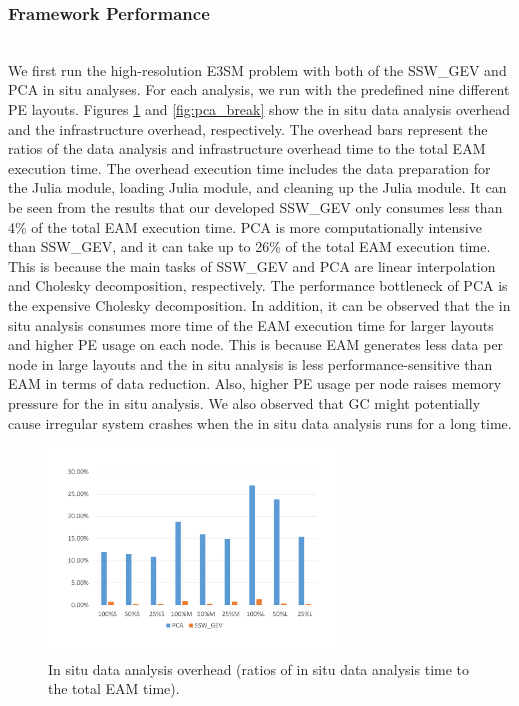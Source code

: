 \documentclass{juliacon}
\begin{document}
\subsubsection{Framework Performance}\hspace*{\fill} \\

We first run the high-resolution E3SM problem with both of the SSW\_GEV and PCA in situ analyses. For each analysis, we run with the predefined nine different PE layouts. Figures \ref{fig:ssw_break} and \ref{fig:pca_break} show the in situ data analysis overhead and the infrastructure overhead, respectively. The overhead bars represent the ratios of the data analysis and infrastructure overhead time to the total EAM execution time. The overhead execution time includes the data preparation for the Julia module, loading Julia module, and cleaning up the Julia module. It can be seen from the results that our developed SSW\_GEV only consumes less than 4\% of the total EAM execution time. PCA is more computationally intensive than SSW\_GEV, and it can take up to 26\% of the total EAM execution time. This is because the main tasks of SSW\_GEV and PCA are linear interpolation and Cholesky decomposition, respectively. The performance bottleneck of PCA is the expensive Cholesky decomposition. In addition, it can be observed that the in situ analysis consumes more time of the EAM execution time for larger layouts and higher PE usage on each node. This is because EAM generates less data per node in large layouts and the in situ analysis is less performance-sensitive than EAM in terms of data reduction. Also, higher PE usage per node raises memory pressure for the in situ analysis. We also observed that GC might potentially cause irregular system crashes when the in situ data analysis runs for a long time.

\begin{figure}
    \centering
    \includegraphics[width=\linewidth, height=5.5cm]{figures/analysisoverhead.pdf}
    \caption{In situ data analysis overhead (ratios of in situ data analysis time to the total EAM time).}
    \label{fig:ssw_break}
\end{figure}
\end{document}
